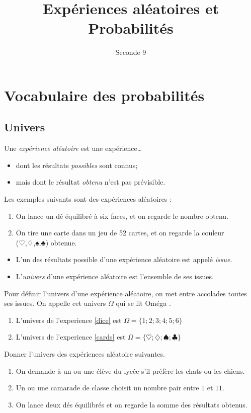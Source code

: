 \documentclass{article}
\title{Expériences aléatoires et Probabilités}
\author{Seconde 9}
\date{}
\begin{document}
\maketitle
\section{Vocabulaire des probabilités}
\subsection{Univers}
\begin{definition}
Une \emph{expérience aléatoire} est une expérience\dots
\begin{itemize}
\item dont les résultats \emph{possibles} sont connus;
\item mais dont le résultat \emph{obtenu} n'est pas prévisible.
\end{itemize}
\end{definition}
\begin{example} Les exemples suivants sont des expériences aléatoires :
\begin{enumerate}
\item On lance un dé équilibré à six faces, et on regarde le nombre obtenu.
\label{dice}
\item On tire une carte dans un jeu de 52 cartes, et on regarde la couleur (♡,♢,♠,♣) obtenue. 
\label{cards}
\end{enumerate}
\end{example}
\begin{definition}
\begin{itemize}
\item L'un des résultats possible d'une expérience aléatoire est appelé \emph{issue}.
\item L'\emph{univers} d'une expérience aléatoire est l'ensemble de ses issues.
\end{itemize}
\end{definition}
\begin{example}
Pour définir l'univers d'une expérience aléatoire, on met entre accolades toutes ses issues. On appelle cet univers $\Omega$ qui se lit \og Oméga \fg.
\begin{enumerate}
\item L'univers de l'experience \ref{dice} est $\Omega = \{1;2;3;4;5;6\}$ 
\item L'univers de l'experience \ref{cards} est $\Omega = \{♡;♢;♠;♣\}$ 
\end{enumerate}    
\end{example}
\begin{exercize}
Donner l'univers des expériences aléatoire suivantes.
\begin{enumerate}[label=\alph*)]
\item On demande à un ou une élève du lycée s'il préfère les chats ou les chiens.
\item Un ou une camarade de classe choisit un nombre pair entre $1$ et $11$.
\item On lance deux dés équilibrés et on regarde la somme des résultats obtenus.
\end{enumerate}
\end{exercize}
\emptybox{7cm}
\newpage
\end{document}
